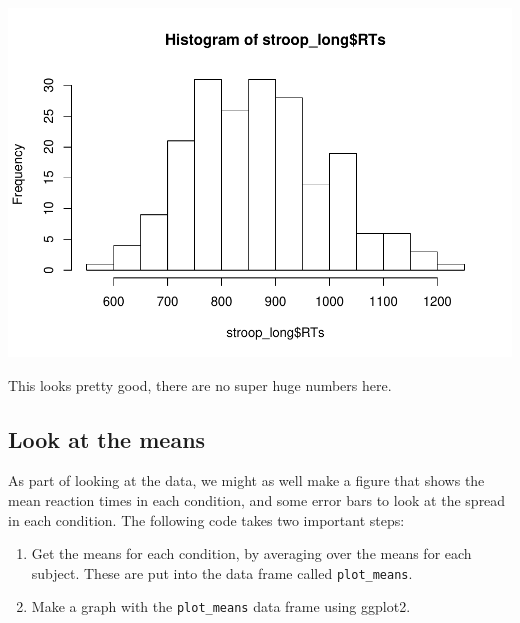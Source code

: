 \documentclass[]{book}
\newenvironment{Shaded}{\begin{snugshade}}{\end{snugshade}}
\newcommand{\KeywordTok}[1]{\textcolor[rgb]{0.13,0.29,0.53}{\textbf{#1}}}
\newcommand{\OperatorTok}[1]{\textcolor[rgb]{0.81,0.36,0.00}{\textbf{#1}}}
\newcommand{\NormalTok}[1]{#1}
\begin{document}
\begin{Shaded}
\end{Shaded}

\includegraphics{Statistics_Lab_files/figure-latex/unnamed-chunk-294-1.pdf}

This looks pretty good, there are no super huge numbers here.

\subsection{Look at the means}\label{look-at-the-means-1}

As part of looking at the data, we might as well make a figure that
shows the mean reaction times in each condition, and some error bars to
look at the spread in each condition. The following code takes two
important steps:

\begin{enumerate}
\def\labelenumi{\arabic{enumi}.}
\item
  Get the means for each condition, by averaging over the means for each
  subject. These are put into the data frame called
  \texttt{plot\_means}.
\item
  Make a graph with the \texttt{plot\_means} data frame using ggplot2.
\end{enumerate}
\end{document}
